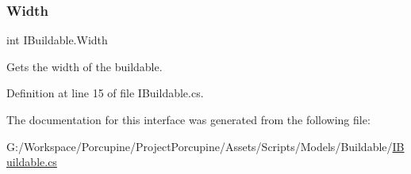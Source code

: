 \subsubsection{\texorpdfstring{Width}{Width}}
{\footnotesize\ttfamily int I\+Buildable.\+Width\hspace{0.3cm}{\ttfamily [get]}}



Gets the width of the buildable. 



Definition at line 15 of file I\+Buildable.\+cs.



The documentation for this interface was generated from the following file\+:\begin{DoxyCompactItemize}
\item 
G\+:/\+Workspace/\+Porcupine/\+Project\+Porcupine/\+Assets/\+Scripts/\+Models/\+Buildable/\hyperlink{_i_buildable_8cs}{I\+Buildable.\+cs}\end{DoxyCompactItemize}
